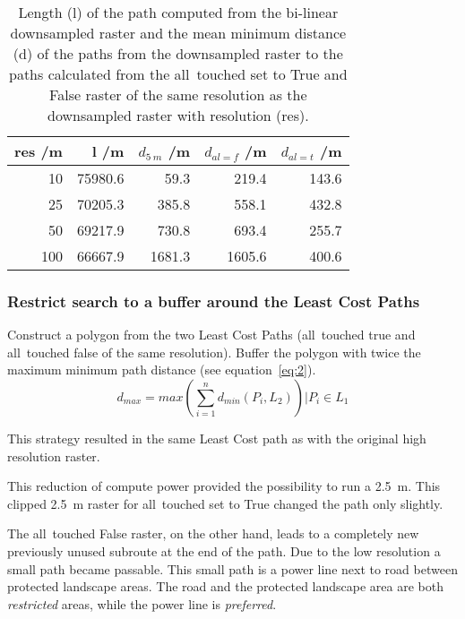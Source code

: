\begin{table}[h!]
	\caption{Length (l) of the path computed from the bi-linear downsampled raster and the mean minimum distance (d) of the paths from the downsampled raster to the paths calculated from the all~touched set to True and False raster of the same resolution as the downsampled raster with resolution (res).}
	\label{tab:5}
	\centering
	\begin{tabular}{ r  r  r  r  r}
		res /m & l /m  & $d_{5~m}$ /m &  $d_{al=f}$ /m & $d_{al=t}$ /m \\
		\hline
		
		10  & 75980.6 &    59.3 &  219.4 & 143.6\\
		25  & 70205.3 &   385.8 &  558.1 & 432.8\\
		50  & 69217.9 &   730.8 &  693.4 & 255.7\\
		100 & 66667.9 &  1681.3 & 1605.6 & 400.6\\
		
	\end{tabular}
\end{table}


\subsubsection{Restrict search to a buffer around the Least Cost Paths}



Construct a polygon from the two Least Cost Paths (all~touched true and all~touched false of the same resolution).
Buffer the polygon with twice the maximum  minimum path distance  (see equation~\ref{eq:2}).
\begin{equation}
	\label{eq:2}
	d_{max} = max(\sum_{i=1}^{n} d_{min}(P_i, L_2)) \Bigr\vert P_i \in L_1
\end{equation}

This strategy resulted in the same Least Cost path as with the original high resolution raster.

This reduction of compute power provided the possibility  to run a 2.5~m.
This clipped 2.5~m raster for all~touched set to True changed the path only slightly. 

The all~touched False raster, on the other hand, leads to a completely new previously unused subroute at the end of the path.
Due to the low resolution a small path became passable.
This small path is a power line next to road between protected landscape areas.
The road and the protected landscape area are both \textit{restricted} areas, while the power line is \textit{preferred}.



